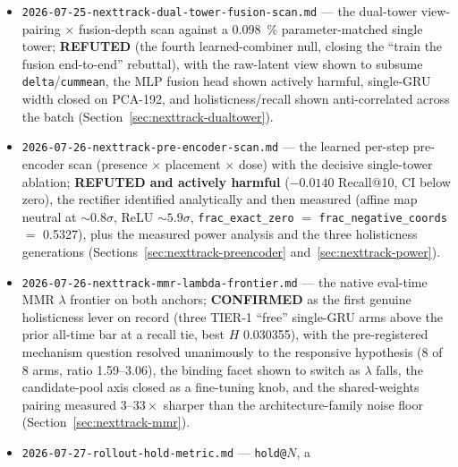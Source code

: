 \documentclass[11pt]{article}
\begin{document}
\begin{itemize}
    a display-only session-holisticness metric suite (artist\_adj@10 /
    mood\_coh@10 / ild@10) and two anti-eager levers (eval-time MMR
    \texttt{mmr\_lambda}, training-time \texttt{eager\_beta}); the champion is
    the most artist-eager model, the eagerness is sourced from the Markov leg,
    GRU\,$\approx$\,LSTM, and MMR $\lambda$ is the strong knob
    (Section~\ref{sec:nexttrack-holisticness}).
  \item \texttt{2026-07-25-nexttrack-dual-tower-fusion-scan.md} --- the
    dual-tower view-pairing $\times$ fusion-depth scan against a
    \SI{0.098}{\percent} parameter-matched single tower; \textbf{REFUTED} (the
    fourth learned-combiner null, closing the ``train the fusion end-to-end''
    rebuttal), with the raw-latent view shown to subsume
    \texttt{delta}/\texttt{cummean}, the MLP fusion head shown actively harmful,
    single-GRU width closed on PCA-192, and holisticness/recall shown
    anti-correlated across the batch (Section~\ref{sec:nexttrack-dualtower}).
  \item \texttt{2026-07-26-nexttrack-pre-encoder-scan.md} --- the learned
    per-step pre-encoder scan (presence $\times$ placement $\times$ dose) with the
    decisive single-tower ablation; \textbf{REFUTED and actively harmful}
    ($-\num{0.0140}$ Recall@10, CI below zero), the rectifier identified
    analytically and then measured (affine map neutral at ${\sim}0.8\sigma$, ReLU
    ${\sim}5.9\sigma$, \texttt{frac\_exact\_zero} $=$
    \texttt{frac\_negative\_coords} $=$ \num{0.5327}), plus the measured power
    analysis and the three holisticness generations
    (Sections~\ref{sec:nexttrack-preencoder} and~\ref{sec:nexttrack-power}).
  \item \texttt{2026-07-26-nexttrack-mmr-lambda-frontier.md} --- the native
    eval-time MMR $\lambda$ frontier on both anchors; \textbf{CONFIRMED} as the
    first genuine holisticness lever on record (three TIER-1 ``free'' single-GRU
    arms above the prior all-time bar at a recall tie, best $H$ \num{0.030355}),
    with the pre-registered mechanism question resolved unanimously to the
    responsive hypothesis (8 of 8 arms, ratio \numrange{1.59}{3.06}), the binding
    facet shown to switch as $\lambda$ falls, the candidate-pool axis closed as a
    fine-tuning knob, and the shared-weights pairing measured
    $\numrange{3}{33}\times$ sharper than the architecture-family noise floor
    (Section~\ref{sec:nexttrack-mmr}).
  \item \texttt{2026-07-27-rollout-hold-metric.md} --- \texttt{hold@}$N$, a

\end{itemize}
\end{document}
